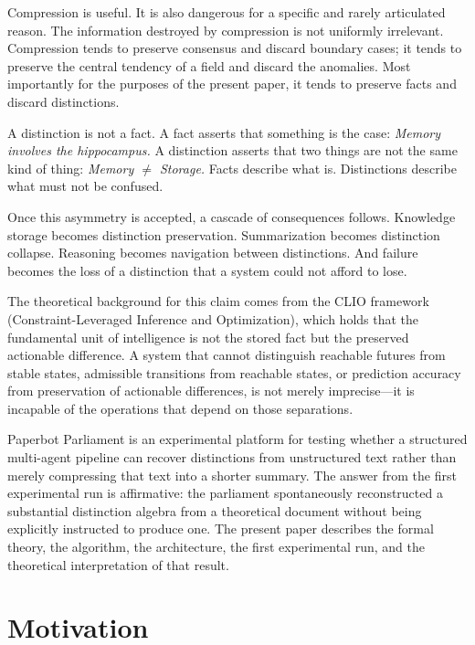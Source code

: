 \documentclass[12pt, a4paper]{article}
\theoremstyle{principle}
\theoremstyle{definition}
\begin{document}
Compression is useful. It is also dangerous for a specific and rarely articulated
reason. The information destroyed by compression is not uniformly irrelevant.
Compression tends to preserve consensus and discard boundary cases; it tends to
preserve the central tendency of a field and discard the anomalies. Most importantly
for the purposes of the present paper, it tends to preserve facts and discard
distinctions.

A distinction is not a fact. A fact asserts that something is the case:
\emph{Memory involves the hippocampus.} A distinction asserts that two things are
not the same kind of thing: \emph{Memory $\neq$ Storage.} Facts describe what is.
Distinctions describe what must not be confused.

Once this asymmetry is accepted, a cascade of consequences follows. Knowledge
storage becomes distinction preservation. Summarization becomes distinction collapse.
Reasoning becomes navigation between distinctions. And failure becomes the loss of a
distinction that a system could not afford to lose.

The theoretical background for this claim comes from the CLIO framework
(Constraint-Leveraged Inference and Optimization), which holds that the fundamental
unit of intelligence is not the stored fact but the preserved actionable difference.
A system that cannot distinguish reachable futures from stable states, admissible
transitions from reachable states, or prediction accuracy from preservation of
actionable differences, is not merely imprecise---it is incapable of the operations
that depend on those separations.

Paperbot Parliament is an experimental platform for testing whether a structured
multi-agent pipeline can recover distinctions from unstructured text rather than
merely compressing that text into a shorter summary. The answer from the first
experimental run is affirmative: the parliament spontaneously reconstructed a
substantial distinction algebra from a theoretical document without being explicitly
instructed to produce one. The present paper describes the formal theory, the
algorithm, the architecture, the first experimental run, and the theoretical
interpretation of that result.

\section{Motivation}
\end{document}
